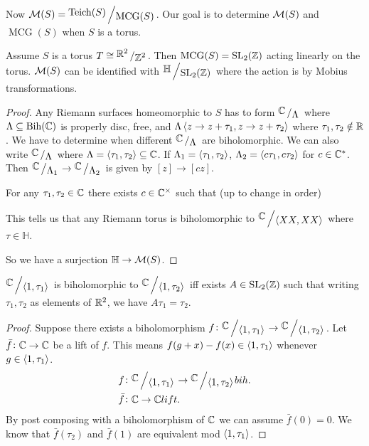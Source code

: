 \documentclass[11pt,a4paper]{article}
\DeclareMathOperator{\Bih}{Bih}
\renewcommand{\H}{\mathbb H}
\DeclareMathOperator{\MCG}{MCG}
\DeclareMathOperator{\Teich}{Teich}
\begin{document}
Now $\M(S) = \bigslant{\Teich(S)}{\MCG(S)}$.
Our goal is to determine $\mathcal{M}(S)$ and $\MCG(S)$ when $S$ is a torus.

\begin{theorem}
  Assume $S$ is a torus $T \cong \bigslant{\R^2}{\Z^2}$.
  Then $\MCG(S) = \SL_2(\Z)$ acting linearly on the torus.
  $\mathcal{M}(S)$ can be identified with $\bigslant{\H}{\SL_2(\Z)}$ where the
  action is by Mobius transformations.
\end{theorem}
\begin{proof}
  Any Riemann surfaces homeomorphic to $S$ has to form 
  $\bigslant{\C}{\Lambda}$ where $\Lambda \subseteq \Bih(\C)$ is
properly disc, free, and $\Lambda \left\langle z \to z + \tau_1, z \to z + \tau_2 \right\rangle$
  where $\tau_1,\tau_2 \notin \mathbb{R}$.
  We have to determine when different $\bigslant{\C}{\Lambda}$ are
  biholomorphic.
  We can also write $\bigslant{\C}{\Lambda}$ where 
  $\Lambda = \left\langle \tau_1, \tau_2 \right\rangle \subseteq \mathbb{C}$.
  If $\Lambda_1 = \left\langle \tau_1, \tau_2 \right\rangle$, $\Lambda_2 = \left\langle c \tau_1, c \tau_2 \right\rangle$
  for $c \in \mathbb{C}^*$.
  Then $\bigslant{\C}{\Lambda_1} \to \bigslant{\C}{\Lambda_2}$
  is given by $[z] \to [cz]$.

  For any $\tau_1, \tau_2 \in \mathbb{C}$ there exists $c \in \mathbb{C}^{\times}$
  such that (up to change in order)


  This tells us that any Riemann torus is biholomorphic to 
  $\bigslant{\C}{\ip{XX}{XX}}$ where $\tau \in \H$.

  So we have a surjection $\H \to \M(S)$.
\end{proof}

\begin{theorem}
  $\bigslant{\C}{\ip{1}{\tau_1}}$ is biholomorphic to 
  $\bigslant{\C}{\ip{1}{\tau_2}}$ iff exists $A \in \mathrm{SL}_2(\mathbb{Z})$
  such that writing $\tau_1, \tau_2$ as elements of $\mathbb{R}^2$, we have
  $A\tau_1 = \tau_2$.
\end{theorem}
\begin{proof}
  Suppose there exists a biholomorphism 
  $f \colon \bigslant{\C}{\ip{1}{\tau_1}} \to \bigslant{\C}{\ip{1}{\tau_2}}$.
  Let $\bar f \colon \mathbb{C} \to \mathbb{C}$ be a lift of $f$.
  This means $f(g + x) - f(x) \in \left\langle 1, \tau_1 \right\rangle$ whenever
  $g \in \left\langle 1, \tau_1 \right\rangle$.
  \begin{align*}
    &f \colon \bigslant{\C}{\ip{1}{\tau_1}} \to \bigslant{\C}{\ip{1}{\tau_2}}
    bih. \\
    &\bar f \colon \C \to \C lift.
  \end{align*}
  By post composing with a biholomorphism of $\mathbb{C}$ we can assume $\bar f(0) = 0$.
  We know that $\bar f(\tau_2)$ and $\bar f(1)$ are equivalent mod
  $\left\langle 1, \tau_1 \right\rangle$.
\end{proof}
\end{document}
